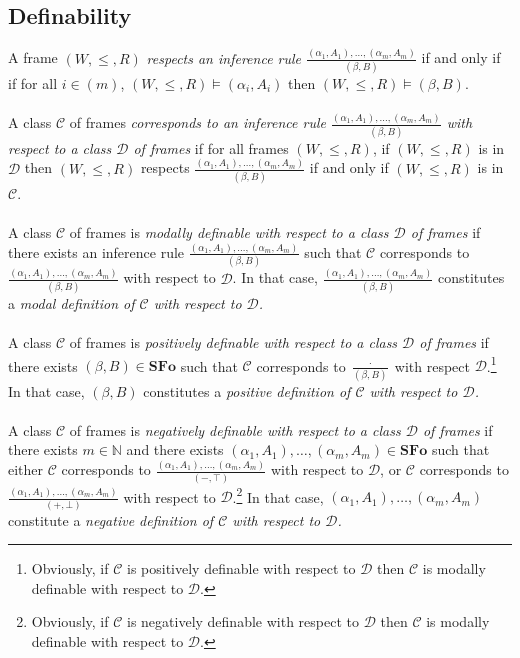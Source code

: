 \documentclass[draft]{article}
\def\N{\mathbb{N}}
\def\SFo{\mathbf{SFo}}
\begin{document}
\subsection{Definability}
%
%
A frame $(W,{\leq},{R})$ {\em respects an inference rule $\frac{(\alpha_{1},A_{1}),\ldots,(\alpha_{m},A_{m})}{(\beta,B)}$}\/ if and only if if for all $i{\in}(m)$, $(W,{\leq},{R}){\models}(\alpha_{i},A_{i})$ then $(W,{\leq},{R}){\models}(\beta,B)$.
%
%
\\
\\
%
%
A class ${\mathcal C}$ of frames {\em corresponds to an inference rule $\frac{(\alpha_{1},A_{1}),\ldots,(\alpha_{m},A_{m})}{(\beta,B)}$ with respect to a class ${\mathcal D}$ of frames}\/ if for all frames $(W,{\leq},{R})$, if $(W,{\leq},{R})$ is in ${\mathcal D}$ then $(W,{\leq},{R})$ respects $\frac{(\alpha_{1},A_{1}),\ldots,(\alpha_{m},A_{m})}{(\beta,B)}$ if and only if $(W,{\leq},{R})$ is in ${\mathcal C}$.
%
%
\\
\\
%
%
A class ${\mathcal C}$ of frames is {\em modally definable with respect to a class ${\mathcal D}$ of frames}\/ if there exists an inference rule $\frac{(\alpha_{1},A_{1}),\ldots,(\alpha_{m},A_{m})}{(\beta,B)}$ such that ${\mathcal C}$ corresponds to $\frac{(\alpha_{1},A_{1}),\ldots,(\alpha_{m},A_{m})}{(\beta,B)}$ with respect to ${\mathcal D}$.
In that case, $\frac{(\alpha_{1},A_{1}),\ldots,(\alpha_{m},A_{m})}{(\beta,B)}$ constitutes a {\em modal definition of ${\mathcal C}$ with respect to ${\mathcal D}$.}
%
%
\\
\\
%
%
A class ${\mathcal C}$ of frames is {\em positively definable with respect to a class ${\mathcal D}$ of frames}\/ if there exists $(\beta,B){\in}\SFo$ such that ${\mathcal C}$ corresponds to $\frac{\cdot}{(\beta,B)}$ with respect ${\mathcal D}$.\footnote{Obviously, if ${\mathcal C}$ is positively definable with respect to ${\mathcal D}$ then ${\mathcal C}$ is modally definable with respect to ${\mathcal D}$.}
In that case, $(\beta,B)$ constitutes a {\em positive definition of ${\mathcal C}$ with respect to ${\mathcal D}$.}
%
%
\\
\\
%
%
A class ${\mathcal C}$ of frames is {\em negatively definable with respect to a class ${\mathcal D}$ of frames}\/ if there exists $m{\in}\N$ and there exists $(\alpha_{1},A_{1}),\ldots,(\alpha_{m},A_{m}){\in}\SFo$ such that either ${\mathcal C}$ corresponds to $\frac{(\alpha_{1},A_{1}),\ldots,(\alpha_{m},A_{m})}{(-,\top)}$ with respect to ${\mathcal D}$, or ${\mathcal C}$ corresponds to $\frac{(\alpha_{1},A_{1}),\ldots,(\alpha_{m},A_{m})}{(+,\bot)}$ with respect to ${\mathcal D}$.\footnote{Obviously, if ${\mathcal C}$ is negatively definable with respect to ${\mathcal D}$ then ${\mathcal C}$ is modally definable with respect to ${\mathcal D}$.}
In that case, $(\alpha_{1},A_{1}),\ldots,(\alpha_{m},A_{m})$ constitute a {\em negative definition of ${\mathcal C}$ with respect to ${\mathcal D}$.}
%
%
%
%
\end{document}
